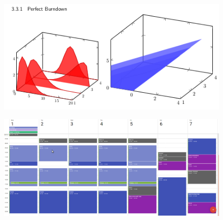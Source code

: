 \documentclass[twocolumn]{article}
\begin{document}

\begin{figure}[t]
{\footnotesize

}
\end{figure}

%

%

\begin{figure}[t]
  \centering\includegraphics[width=\columnwidth,height=0.1\textheight]{burndown}
%
\end{figure}

\begin{figure}[b]
  \centering\includegraphics[width=\linewidth,height=0.6\textheight]{cal}
\end{figure}
\end{document}
